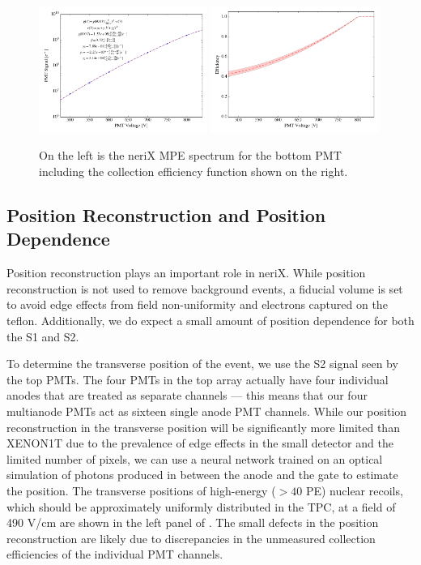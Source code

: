 \begin{figure}[t]
        \centering
	\includegraphics[width=0.49\textwidth]{nerix_mpe_spectrum}
	\includegraphics[width=0.49\textwidth]{nerix_collection_efficiency}
	\caption{On the left is the neriX MPE spectrum for the bottom PMT including the collection efficiency function shown on the right.}
	\label{fig:nerix_mpe}
\end{figure}


\subsection{Position Reconstruction and Position Dependence}

Position reconstruction plays an important role in neriX.  While position reconstruction is not used to remove background events, a fiducial volume is set to avoid edge effects from field non-uniformity and electrons captured on the teflon.  Additionally, we do expect a small amount of position dependence for both the S1 and S2.  

To determine the transverse position of the event, we use the S2 signal seen by the top PMTs.  The four PMTs in the top array actually have four individual anodes that are treated as separate channels --- this means that our four multianode PMTs act as sixteen single anode PMT channels.  While our position reconstruction in the transverse position will be significantly more limited than XENON1T due to the prevalence of edge effects in the small detector and the limited number of pixels, we can use a neural network trained on an optical simulation of photons produced in between the anode and the gate to estimate the position.  The transverse positions of high-energy ($>40$ PE) nuclear recoils, which should be approximately uniformly distributed in the TPC, at a field of 490 V/cm are shown in the left panel of .  The small defects in the position reconstruction are likely due to discrepancies in the unmeasured collection efficiencies of the individual PMT channels.

